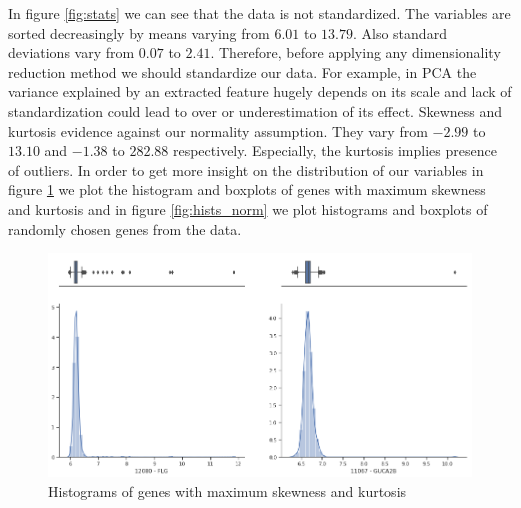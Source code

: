 \documentclass[shortabstract, english, mgr]{iithesis}
\begin{document}
In figure \ref{fig:stats} we can see that the data is not standardized. The variables are sorted decreasingly by means varying from $6.01$ to $13.79$. Also standard deviations vary from $0.07$ to $2.41$. Therefore, before applying any dimensionality reduction method we should standardize our data. For example, in PCA the variance explained by an extracted feature hugely depends on its scale and lack of standardization could lead to over or underestimation of its effect. Skewness and kurtosis evidence against our normality assumption. They vary from $-2.99$ to $13.10$ and $-1.38$ to $282.88$ respectively. Especially, the kurtosis implies presence of outliers. In order to get more insight on the distribution of our variables in figure \ref{fig:hists_out} we plot the histogram and boxplots of genes with maximum skewness and kurtosis and in figure \ref{fig:hists_norm} we plot histograms and boxplots of randomly chosen genes from the data. 

\begin{figure}
\centering
\includegraphics[width=\textwidth]{images/hists_ouliers.png}
\caption{Histograms of genes with maximum skewness and kurtosis}
\label{fig:hists_out}
\end{figure}
\end{document}
